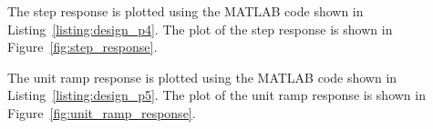 \documentclass[12pt]{article}
\begin{document}


The step response is plotted using the MATLAB code shown in Listing~\ref{listing:design_p4}. The plot of the step response is shown in Figure~\ref{fig:step_response}.



The unit ramp response is plotted using the MATLAB code shown in Listing~\ref{listing:design_p5}. The plot of the unit ramp response is shown in Figure~\ref{fig:unit_ramp_response}.


\end{document}

